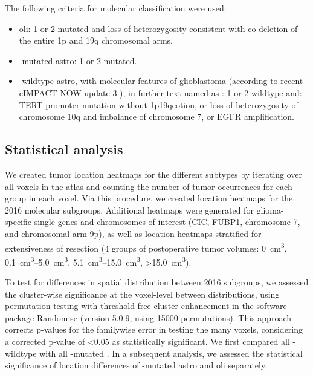 The following criteria for molecular classification were used:

\begin{itemize}

\item \Gls{oli}: 1 or 2 mutated and loss of heterozygosity consistent with co-deletion of the entire 1p and 19q chromosomal arms.

\item {}-mutated \gls{astro}: 1 or 2 mutated.

\item {}-wildtype \gls{astro}, with molecular features of \gls{glioblastoma} (according to recent cIMPACT-NOW update 3 \autocite{brat2018IMPACT}), in further text named as : 1 or 2 wildtype and: TERT promoter mutation without \acl{1p19qcotion}, or loss of heterozygosity of chromosome 10q and imbalance of chromosome 7, or EGFR amplification.

\end{itemize}

\subsection{Statistical analysis}
We created \gls{tumor} location heatmaps for the different  subtypes by iterating over all voxels in the  atlas and counting the number of \gls{tumor} occurrences for each group in each voxel.
Via this procedure, we created location heatmaps for the  2016 molecular subgroups.
Additional heatmaps were generated for glioma-specific single genes and chromosomes of interest (CIC, FUBP1, chromosome 7, and chromosomal arm 9p), as well as location heatmaps stratified for extensiveness of resection (4 groups of postoperative \gls{tumor} volumes: \SI{0}{\cubic\centi\metre}, \SIrange{0.1}{5.0}{\cubic\centi\metre}, \SIrange{5.1}{15.0}{\cubic\centi\metre}, \SI{>15.0}{\cubic\centi\metre}).

To test for differences in spatial distribution between  2016 subgroups, we assessed the cluster-wise significance at the voxel-level between distributions, using permutation testing with threshold free cluster enhancement in the software package  Randomise \autocite{smith2009threshold, winkler2014permutation} (version 5.0.9, using \num{15000} permutations).
This approach corrects p-values for the familywise error in testing the many voxels, considering a corrected p-value of \num{<0.05} as statistically significant.
We first compared all -wildtype  with all -mutated .
In a subsequent analysis, we assessed the statistical significance of location differences of -mutated \gls{astro} and \gls{oli} separately.

